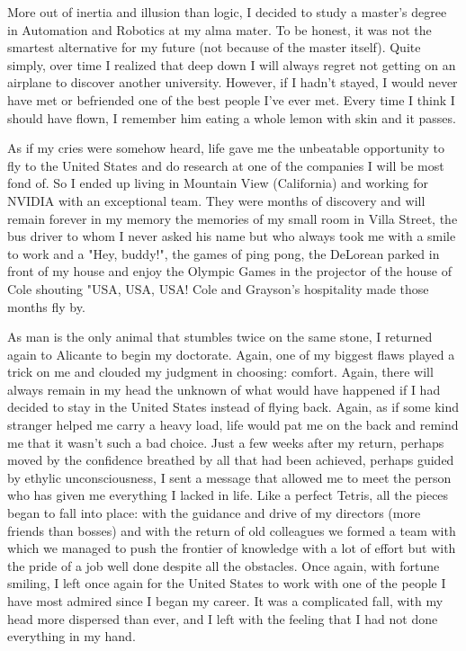 More out of inertia and illusion than logic, I decided to study a master's degree in Automation and Robotics at my alma mater. To be honest, it was not the smartest alternative for my future (not because of the master itself). Quite simply, over time I realized that deep down I will always regret not getting on an airplane to discover another university. However, if I hadn't stayed, I would never have met or befriended one of the best people I've ever met. Every time I think I should have flown, I remember him eating a whole lemon with skin and it passes.

As if my cries were somehow heard, life gave me the unbeatable opportunity to fly to the United States and do research at one of the companies I will be most fond of. So I ended up living in Mountain View (California) and working for NVIDIA with an exceptional team. They were months of discovery and will remain forever in my memory the memories of my small room in Villa Street, the bus driver to whom I never asked his name but who always took me with a smile to work and a "Hey, buddy!", the games of ping pong, the DeLorean parked in front of my house and enjoy the Olympic Games in the projector of the house of Cole shouting "USA, USA, USA! Cole and Grayson's hospitality made those months fly by.

As man is the only animal that stumbles twice on the same stone, I returned again to Alicante to begin my doctorate. Again, one of my biggest flaws played a trick on me and clouded my judgment in choosing: comfort. Again, there will always remain in my head the unknown of what would have happened if I had decided to stay in the United States instead of flying back. Again, as if some kind stranger helped me carry a heavy load, life would pat me on the back and remind me that it wasn't such a bad choice. Just a few weeks after my return, perhaps moved by the confidence breathed by all that had been achieved, perhaps guided by ethylic unconsciousness, I sent a message that allowed me to meet the person who has given me everything I lacked in life. Like a perfect Tetris, all the pieces began to fall into place: with the guidance and drive of my directors (more friends than bosses) and with the return of old colleagues we formed a team with which we managed to push the frontier of knowledge with a lot of effort but with the pride of a job well done despite all the obstacles. Once again, with fortune smiling, I left once again for the United States to work with one of the people I have most admired since I began my career. It was a complicated fall, with my head more dispersed than ever, and I left with the feeling that I had not done everything in my hand.

